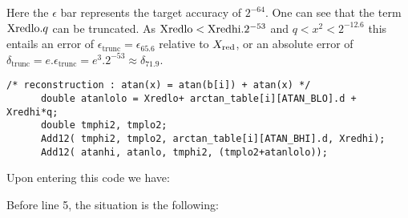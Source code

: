   Here the $\epsilon$ bar represents the target accuracy of $2^{-64}$.
  One can see that the term ${\mathrm{Xredlo}}.q$ can be truncated. As ${\mathrm{Xredlo}}
  < {\mathrm{Xredhi}}.2^{-53}$ and $q<x^2<2^{-12.6}$ this entails an error of
  $\epsilon_\mathrm{trunc} = \epsilon_{65.6}$ relative to $X_{\mathrm{red}}$,
  or an absolute error of $\delta_\mathrm{trunc} =
    e.\epsilon_\mathrm{trunc} = e^3 .2^{-53} \approx \delta_{71.9}$.


\begin{lstlisting}[caption={Reconstruction},firstnumber=1]
      /* reconstruction : atan(x) = atan(b[i]) + atan(x) */
      double atanlolo = Xredlo+ arctan_table[i][ATAN_BLO].d + Xredhi*q;
      double tmphi2, tmplo2;
      Add12( tmphi2, tmplo2, arctan_table[i][ATAN_BHI].d, Xredhi);
      Add12( atanhi, atanlo, tmphi2, (tmplo2+atanlolo));

\end{lstlisting}

Upon entering this code we have:
\begin{center}
 \small
 \setlength{\unitlength}{3ex}
  \end{center}


Before line 5, the situation is the following:

